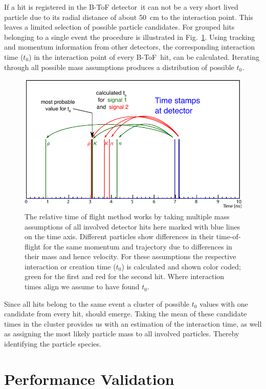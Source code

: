 \documentclass[12pt,a4paper,oneside]{article}
\newcommand{\fig}{Fig.}
\newcommand{\btof}{B-ToF}
\newcommand{\btofD}{B-ToF detector}
\begin{document}
If a hit is registered in the \btofD\ it can not be a very short lived particle due to its radial distance of about \SI{50}{cm} to the interaction point.
This leaves a limited selection of possible particle candidates.
For grouped hits belonging to a single event the procedure is illustrated in \fig ~\ref{fig:relToF}.
Using tracking and momentum information from other detectors, the corresponding interaction time ($t_0$) in the interaction point of every \btof\ hit, can be calculated.
Iterating through all possible mass assumptions produces a distribution of possible $t_0$.
 
\begin{figure}
	\centering
	\includegraphics[width=.9\textwidth]{fig/relTof_basic.pdf}
	\caption{The relative time of flight method works by taking multiple mass assumptions of all involved detector hits here marked with blue lines on the time axis. Different
particles show differences in their time-of-flight for the same momentum and trajectory
due to differences in their mass and hence velocity. For these assumptions the respective
interaction or creation time ($t_0$) is calculated and shown color coded; green for the first and
red for the second hit. Where interaction times align we assume to have found $t_0$.}
	\label{fig:relToF}
\end{figure}

Since all hits belong to the same event a cluster of possible $t_0$ values with one candidate from every hit, should emerge.
Taking the mean of these candidate times in the cluster provides us with an estimation of the interaction time, as well as assigning the most likely particle mass to all involved particles.
Thereby identifying the particle species.


\section{Performance Validation}
\end{document}

